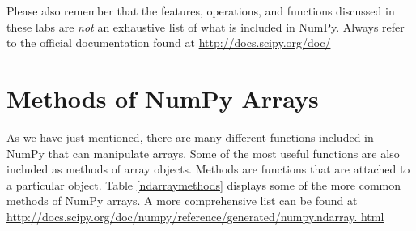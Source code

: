 Please also remember that the features, operations, and functions
discussed in these labs are \emph{not} an exhaustive list
of what is included in NumPy. Always refer to the official
documentation found at \url{http://docs.scipy.org/doc/}

\section*{Methods of NumPy Arrays} 
As we have just mentioned, there are
many different functions included in NumPy that can manipulate arrays. Some of the most useful functions are also included as
methods of array objects. Methods are functions that are 
attached to a particular object. Table \ref{ndarraymethods} displays some of 
the more common methods of NumPy arrays. A more comprehensive list can be found at
\url{http://docs.scipy.org/doc/numpy/reference/generated/numpy.ndarray.
html}

